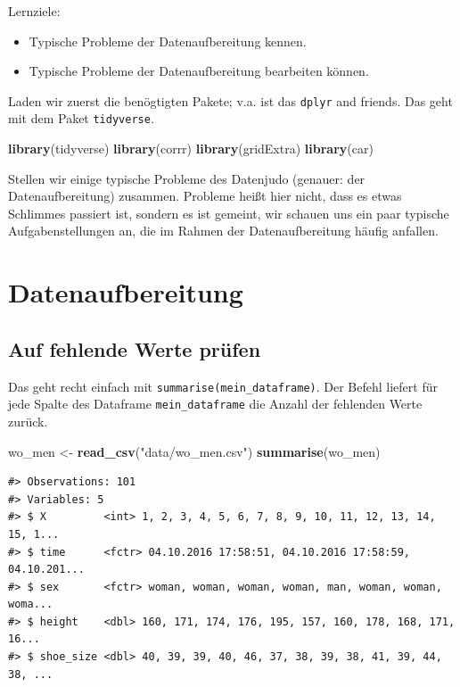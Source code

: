 \documentclass[12pt,ngerman,]{book}
\makeatletter
\newenvironment{Shaded}{\begin{snugshade}}{\end{snugshade}}
\newcommand{\KeywordTok}[1]{\textcolor[rgb]{0.13,0.29,0.53}{\textbf{{#1}}}}
\newcommand{\StringTok}[1]{\textcolor[rgb]{0.31,0.60,0.02}{{#1}}}
\newcommand{\NormalTok}[1]{{#1}}
\providecommand{\tightlist}{%
  \setlength{\itemsep}{0pt}\setlength{\parskip}{0pt}}
\newenvironment{kframe}{%
\medskip{}
\setlength{\fboxsep}{.8em}
 \def\at@end@of@kframe{}%
 \ifinner\ifhmode%
  \def\at@end@of@kframe{\end{minipage}}%
  \begin{minipage}{\columnwidth}%
 \fi\fi%
 \def\FrameCommand##1{\hskip\@totalleftmargin \hskip-\fboxsep
 \colorbox{shadecolor}{##1}\hskip-\fboxsep
     \hskip-\linewidth \hskip-\@totalleftmargin \hskip\columnwidth}%
 \MakeFramed {\advance\hsize-\width
   \@totalleftmargin\z@ \linewidth\hsize
   \@setminipage}}%
 {\par\unskip\endMakeFramed%
 \at@end@of@kframe}
\renewenvironment{Shaded}{\begin{kframe}}{\end{kframe}}
\let\BeginKnitrBlock\begin \let\EndKnitrBlock\end
\makeatother
\begin{document}
\BeginKnitrBlock{rmdcaution}
Lernziele:

\begin{itemize}
\tightlist
\item
  Typische Probleme der Datenaufbereitung kennen.
\item
  Typische Probleme der Datenaufbereitung bearbeiten können.
\end{itemize}
\EndKnitrBlock{rmdcaution}

Laden wir zuerst die benögtigten Pakete; v.a. ist das \texttt{dplyr} and
friends. Das geht mit dem Paket \texttt{tidyverse}.

\begin{Shaded}
\begin{Highlighting}[]
\KeywordTok{library}\NormalTok{(tidyverse)}
\KeywordTok{library}\NormalTok{(corrr)}
\KeywordTok{library}\NormalTok{(gridExtra)}
\KeywordTok{library}\NormalTok{(car)}
\end{Highlighting}
\end{Shaded}

Stellen wir einige typische Probleme des Datenjudo (genauer: der
Datenaufbereitung) zusammen. Probleme heißt hier nicht, dass es etwas
Schlimmes passiert ist, sondern es ist gemeint, wir schauen uns ein paar
typische Aufgabenstellungen an, die im Rahmen der Datenaufbereitung
häufig anfallen.

\section{Datenaufbereitung}\label{datenaufbereitung}

\subsection{Auf fehlende Werte prüfen}\label{auf-fehlende-werte-prufen}

Das geht recht einfach mit \texttt{summarise(mein\_dataframe)}. Der
Befehl liefert für jede Spalte des Dataframe \texttt{mein\_dataframe}
die Anzahl der fehlenden Werte zurück.

\begin{Shaded}
\begin{Highlighting}[]
\NormalTok{wo_men <-}\StringTok{ }\KeywordTok{read_csv}\NormalTok{(}\StringTok{"data/wo_men.csv"}\NormalTok{)}
\KeywordTok{summarise}\NormalTok{(wo_men)}
\end{Highlighting}
\end{Shaded}

\begin{verbatim}
#> Observations: 101
#> Variables: 5
#> $ X         <int> 1, 2, 3, 4, 5, 6, 7, 8, 9, 10, 11, 12, 13, 14, 15, 1...
#> $ time      <fctr> 04.10.2016 17:58:51, 04.10.2016 17:58:59, 04.10.201...
#> $ sex       <fctr> woman, woman, woman, woman, man, woman, woman, woma...
#> $ height    <dbl> 160, 171, 174, 176, 195, 157, 160, 178, 168, 171, 16...
#> $ shoe_size <dbl> 40, 39, 39, 40, 46, 37, 38, 39, 38, 41, 39, 44, 38, ...
\end{verbatim}
\end{document}
